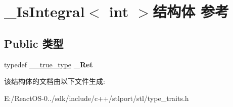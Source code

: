 \hypertarget{struct___is_integral_3_01int_01_4}{}\section{\+\_\+\+Is\+Integral$<$ int $>$结构体 参考}
\label{struct___is_integral_3_01int_01_4}
\subsection*{Public 类型}
\begin{DoxyCompactItemize}
\item 
\mbox{\label{struct___is_integral_3_01int_01_4_a1c9936eed0ee97e2443d095b182d82d0}} 
typedef \hyperlink{struct____true__type}{\+\_\+\+\_\+true\+\_\+type} {\bfseries \+\_\+\+Ret}
\end{DoxyCompactItemize}


该结构体的文档由以下文件生成\+:\begin{DoxyCompactItemize}
\item 
E\+:/\+React\+O\+S-\/0../sdk/include/c++/stlport/stl/type\+\_\+traits.\+h\end{DoxyCompactItemize}
